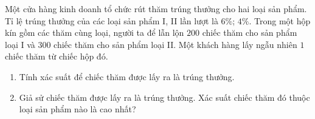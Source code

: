 \begin{bt}
	Một cửa hàng kinh doanh tổ chức rút thăm trúng thưởng cho hai loại sản phẩm. Tỉ lệ trúng thưởng của các loại sản phẩm I, II lần lượt là $6 \%$; $4 \%$. Trong một hộp kín gồm các thăm cùng loại, người ta để lẫn lộn $200$ chiếc thăm cho sản phẩm loại I và $300$ chiếc thăm cho sản phẩm loại II. Một khách hàng lấy ngẫu nhiên $1$ chiếc thăm từ chiếc hộp đó.
	\begin{enumerate}
	\item Tính xác suất để chiếc thăm được lấy ra là trúng thưởng.
	\item Giả sử chiếc thăm được lấy ra là trúng thưởng. Xác suất chiếc thăm đó thuộc loại sản phẩm nào là cao nhất?
	\end{enumerate}
\end{bt}

